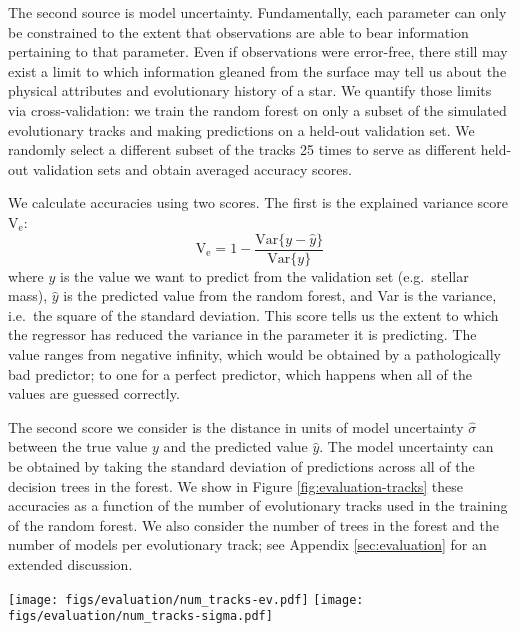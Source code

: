 \documentclass[manuscript]{aastex}
\begin{document}
The second source is model uncertainty. Fundamentally, each parameter can only be constrained to the extent that observations are able to bear information pertaining to that parameter. Even if observations were error-free, there still may exist a limit to which information gleaned from the surface may tell us about the physical attributes and evolutionary history of a star. We quantify those limits via cross-validation: we train the random forest on only a subset of the simulated evolutionary tracks and making predictions on a held-out validation set. We randomly select a different subset of the tracks 25 times to serve as different held-out validation sets and obtain averaged accuracy scores. 

We calculate accuracies using two scores. The first is the explained variance score V$_{\text{e}}$:
\begin{equation}
  \text{V}_{\text{e}} = 1 - \frac{\text{Var}\{ y - \hat y \}}{\text{Var}\{ y \}}
\end{equation}
where $y$ is the value we want to predict from the validation set (e.g.~stellar mass), $\hat y$ is the predicted value from the random forest, and Var is the variance, i.e.~the square of the standard deviation. This score tells us the extent to which the regressor has reduced the variance in the parameter it is predicting. The value ranges from negative infinity, which would be obtained by a pathologically bad predictor; to one for a perfect predictor, which happens when all of the values are guessed correctly. 

The second score we consider is the distance in units of model uncertainty $\hat \sigma$ between the true value $y$ and the predicted value $\hat y$. The model uncertainty can be obtained by taking the standard deviation of predictions across all of the decision trees in the forest. We show in Figure \ref{fig:evaluation-tracks} these accuracies as a function of the number of evolutionary tracks used in the training of the random forest. We also consider the number of trees in the forest and the number of models per evolutionary track; see Appendix \ref{sec:evaluation} for an extended discussion. 

\begin{figure*}
    \centering
    \texttt{[image: figs/evaluation/num\_tracks-ev.pdf]}\hfill
    \texttt{[image: figs/evaluation/num\_tracks-sigma.pdf]}
    \caption{Explained variance (left) and accuracy per precision score (right) of each stellar parameter as a function of the number of evolutionary tracks used in training the random forest. \textbf{todo: remove mass_cc} } 
    \label{fig:evaluation-tracks}
\end{figure*}
\end{document}
